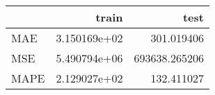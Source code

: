 \begin{tabular}{lrr}
\toprule
{} &         train &           test \\
\midrule
MAE  &  3.150169e+02 &     301.019406 \\
MSE  &  5.490794e+06 &  693638.265206 \\
MAPE &  2.129027e+02 &     132.411027 \\
\bottomrule
\end{tabular}
